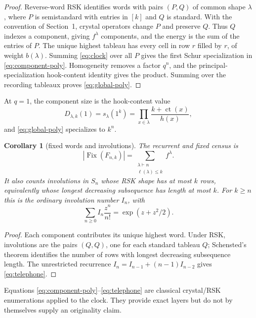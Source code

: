 \documentclass[a4paper,10pt]{amsart}
\newtheorem{corollary}[theorem]{Corollary}
\theoremstyle{remark}
\newcommand{\Fix}{\operatorname{Fix}}
\begin{document}
\begin{proof}
Reverse-word RSK identifies words with pairs $(P,Q)$ of common shape
$\lambda$, where $P$ is semistandard with entries in $[k]$ and $Q$ is
standard.  With the convention of Section~1, crystal operators change $P$
and preserve $Q$.  Thus $Q$ indexes a component, giving $f^\lambda$
components, and the energy is the sum of the entries of $P$.  The unique
highest tableau has every cell in row $r$ filled by $r$, of weight
$b(\lambda)$.  Summing \eqref{eq:clock} over all $P$ gives the first Schur
specialization in \eqref{eq:component-poly}.  Homogeneity removes a factor
$q^n$, and the principal-specialization hook-content identity gives the
product.  Summing over the recording tableaux proves \eqref{eq:global-poly}.
\end{proof}

At $q=1$, the component size is the hook-content value
\begin{equation}\label{eq:hook-content}
 D_{\lambda,k}(1)=s_\lambda(1^k)
 =\prod_{x\in\lambda}\frac{k+\operatorname{ct}(x)}{h(x)},
\end{equation}
and \eqref{eq:global-poly} specializes to $k^n$.

\begin{corollary}[fixed words and involutions]\label{cor:fixed}
The recurrent and fixed census is
\begin{equation}\label{eq:fixed-count}
 |\Fix(F_{n,k})|
 =\sum_{\substack{\lambda\vdash n\\\ell(\lambda)\leq k}}f^\lambda.
\end{equation}
It also counts involutions in $S_n$ whose RSK shape has at most $k$ rows,
equivalently whose longest decreasing subsequence has length at most $k$.
For $k\geq n$ this is the ordinary involution number $I_n$, with
\begin{equation}\label{eq:telephone}
 \sum_{n\geq0}I_n\frac{z^n}{n!}=\exp(z+z^2/2).
\end{equation}
\end{corollary}

\begin{proof}
Each component contributes its unique highest word.  Under RSK, involutions
are the pairs $(Q,Q)$, one for each standard tableau $Q$; Schensted's theorem
identifies the number of rows with longest decreasing subsequence length.
The unrestricted recurrence $I_n=I_{n-1}+(n-1)I_{n-2}$ gives
\eqref{eq:telephone}.
\end{proof}

Equations \eqref{eq:component-poly}--\eqref{eq:telephone} are classical
crystal/RSK enumerations applied to the clock.  They provide exact layers but
do not by themselves supply an originality claim.
\end{document}

